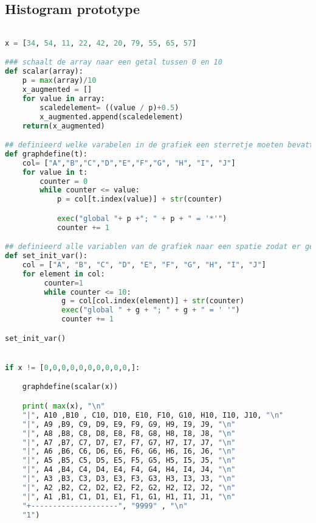 \documentclass{article}
\begin{document}
\subsection{Histogram prototype}
\begin{lstlisting}[frame=single, language=python]

x = [34, 54, 11, 22, 42, 20, 79, 55, 65, 57]

### schaalt de array naar een getal tussen 0 en 10
def scalar(array):
    p = max(array)/10
    x_augmented = []
    for value in array:
        scaledelement= ((value / p)+0.5)
        x_augmented.append(scaledelement)
    return(x_augmented)

## definieerd welke varabelen in de grafiek een sterretje moeten bevatten
def graphdefine(t):
    col= ["A","B","C","D","E","F","G", "H", "I", "J"]
    for value in t:
        counter = 0
        while counter <= value:
            p = col[t.index(value)] + str(counter)

            exec("global "+ p +"; " + p + " = '*'")
            counter += 1

## definieerd alle variablen van de grafiek naar een spatie zodat er geen errors voorkomen
def set_init_var():
    col = ["A", "B", "C", "D", "E", "F", "G", "H", "I", "J"]
    for element in col:
         counter=1
         while counter <= 10:
             g = col[col.index(element)] + str(counter)
             exec("global " + g + "; " + g + " = ' '")
             counter += 1

set_init_var()


if x != [0,0,0,0,0,0,0,0,0,0,]:

    graphdefine(scalar(x))

    print( max(x), "\n"
    "|", A10 ,B10 , C10, D10, E10, F10, G10, H10, I10, J10, "\n"
    "|", A9 ,B9, C9, D9, E9, F9, G9, H9, I9, J9, "\n"
    "|", A8 ,B8, C8, D8, E8, F8, G8, H8, I8, J8, "\n"
    "|", A7 ,B7, C7, D7, E7, F7, G7, H7, I7, J7, "\n"
    "|", A6 ,B6, C6, D6, E6, F6, G6, H6, I6, J6, "\n"
    "|", A5 ,B5, C5, D5, E5, F5, G5, H5, I5, J5, "\n"
    "|", A4 ,B4, C4, D4, E4, F4, G4, H4, I4, J4, "\n"
    "|", A3 ,B3, C3, D3, E3, F3, G3, H3, I3, J3, "\n"
    "|", A2 ,B2, C2, D2, E2, F2, G2, H2, I2, J2, "\n"
    "|", A1 ,B1, C1, D1, E1, F1, G1, H1, I1, J1, "\n"
    "+--------------------", "9999" , "\n"
    "1")


\end{lstlisting}
\end{document}
